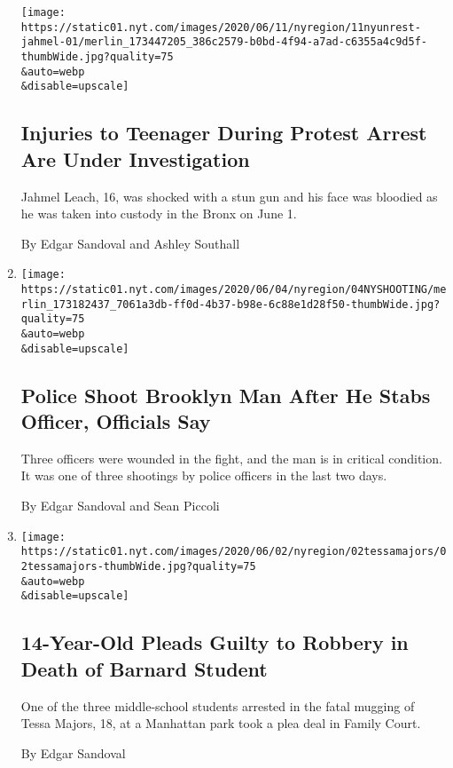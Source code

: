\begin{enumerate}
  \texttt{[image: https://static01.nyt.com/images/2020/06/11/nyregion/11nyunrest-jahmel-01/merlin\_173447205\_386c2579-b0bd-4f94-a7ad-c6355a4c9d5f-thumbWide.jpg?quality=75\\\&auto=webp\\\&disable=upscale]}

  \hypertarget{injuries-to-teenager-during-protest-arrest-are-under-investigation}{%
  \subsection{Injuries to Teenager During Protest Arrest Are Under
  Investigation}\label{injuries-to-teenager-during-protest-arrest-are-under-investigation}}

  Jahmel Leach, 16, was shocked with a stun gun and his face was
  bloodied as he was taken into custody in the Bronx on June 1.

  By Edgar Sandoval and Ashley Southall
\item
  \href{/2020/06/04/nyregion/nypd-officers-shot-brooklyn.html}{}

  \texttt{[image: https://static01.nyt.com/images/2020/06/04/nyregion/04NYSHOOTING/merlin\_173182437\_7061a3db-ff0d-4b37-b98e-6c88e1d28f50-thumbWide.jpg?quality=75\\\&auto=webp\\\&disable=upscale]}

  \hypertarget{police-shoot-brooklyn-man-after-he-stabs-officer-officials-say}{%
  \subsection{Police Shoot Brooklyn Man After He Stabs Officer,
  Officials
  Say}\label{police-shoot-brooklyn-man-after-he-stabs-officer-officials-say}}

  Three officers were wounded in the fight, and the man is in critical
  condition. It was one of three shootings by police officers in the
  last two days.

  By Edgar Sandoval and Sean Piccoli
\item
  \href{/2020/06/03/nyregion/tessa-majors-barnard-plea.html}{}

  \texttt{[image: https://static01.nyt.com/images/2020/06/02/nyregion/02tessamajors/02tessamajors-thumbWide.jpg?quality=75\\\&auto=webp\\\&disable=upscale]}

  \hypertarget{14-year-old-pleads-guilty-to-robbery-in-death-of-barnard-student}{%
  \subsection{14-Year-Old Pleads Guilty to Robbery in Death of Barnard
  Student}\label{14-year-old-pleads-guilty-to-robbery-in-death-of-barnard-student}}

  One of the three middle-school students arrested in the fatal mugging
  of Tessa Majors, 18, at a Manhattan park took a plea deal in Family
  Court.

  By Edgar Sandoval
\end{enumerate}

